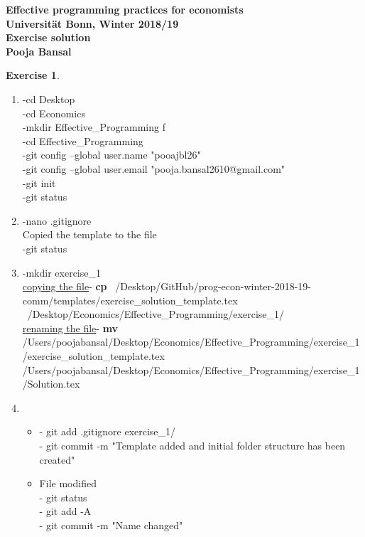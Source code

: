 \documentclass[11pt,a4paper,leqno]{article}
\theoremstyle{definition}
\newtheorem{exercise}{Exercise}
\begin{document}
\begin{center}
    \begin{large}
        \textbf{
        Effective programming practices for economists\\
        Universität Bonn, Winter 2018/19 \\[2ex]
        Exercise solution\\[2ex]
        Pooja Bansal 
        }
    \end{large}
\end{center}


\begin{exercise}
    ~ %
    \begin{enumerate}
    \item  -cd Desktop\\
           -cd Economics\\
           -mkdir Effective\_Programming f\\
           -cd Effective\_Programming \\
           -git config --global user.name "pooajbl26" \\
           -git config --global user.email "pooja.bansal2610@gmail.com"\\
           -git init \\
           -git status 
           
    \item -nano .gitignore \\
    Copied the template to the file\\
          -git status
          
     \item -mkdir exercise\_1 \\
           \underline{copying the file}- \space \textbf{cp} ~/Desktop/GitHub/prog-econ-winter-2018-19-comm/templates/exercise\_solution\_template.tex ~/Desktop/Economics/Effective\_Programming/exercise\_1/ \\
           \underline{renaming the file}- \space \textbf{mv} /Users/poojabansal/Desktop/Economics/Effective\_Programming/exercise\_1/exercise\_solution\_template.tex  /Users/poojabansal/Desktop/Economics/Effective\_Programming/exercise\_1/Solution.tex 
     \item  
     \begin{itemize}
         \item - git add .gitignore exercise\_1/ \\ 
           - git commit -m "Template added and initial folder structure has been created"
          \item File modified\\
           - git status \\
           - git add -A\\
           - git commit -m "Name changed"
           

\end{itemize}
\end{enumerate}
\end{exercise}
\end{document}
